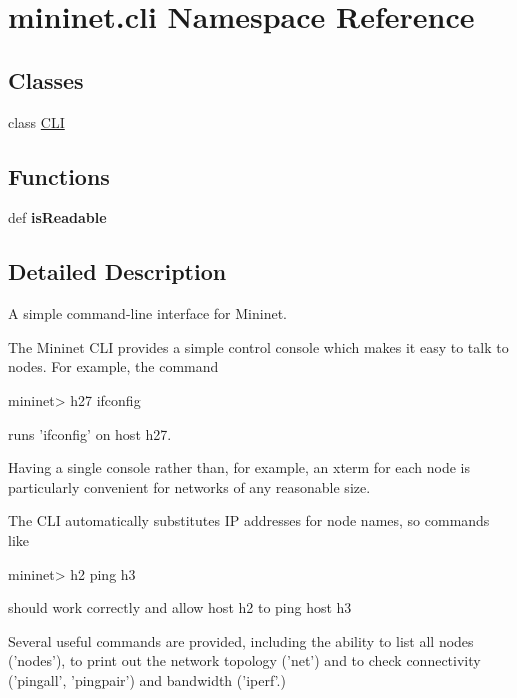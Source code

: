 \hypertarget{namespacemininet_1_1cli}{\section{mininet.\-cli Namespace Reference}
\label{namespacemininet_1_1cli}
}
\subsection*{Classes}
\begin{DoxyCompactItemize}
\item 
class \hyperlink{classmininet_1_1cli_1_1CLI}{C\-L\-I}
\end{DoxyCompactItemize}
\subsection*{Functions}
\begin{DoxyCompactItemize}
\item 
\hypertarget{namespacemininet_1_1cli_a9251a44f20a92d4eb4ecb59354808707}{def {\bfseries is\-Readable}}\label{namespacemininet_1_1cli_a9251a44f20a92d4eb4ecb59354808707}

\end{DoxyCompactItemize}


\subsection{Detailed Description}
\begin{DoxyVerb}A simple command-line interface for Mininet.

The Mininet CLI provides a simple control console which
makes it easy to talk to nodes. For example, the command

mininet> h27 ifconfig

runs 'ifconfig' on host h27.

Having a single console rather than, for example, an xterm for each
node is particularly convenient for networks of any reasonable
size.

The CLI automatically substitutes IP addresses for node names,
so commands like

mininet> h2 ping h3

should work correctly and allow host h2 to ping host h3

Several useful commands are provided, including the ability to
list all nodes ('nodes'), to print out the network topology
('net') and to check connectivity ('pingall', 'pingpair')
and bandwidth ('iperf'.)
\end{DoxyVerb}
 